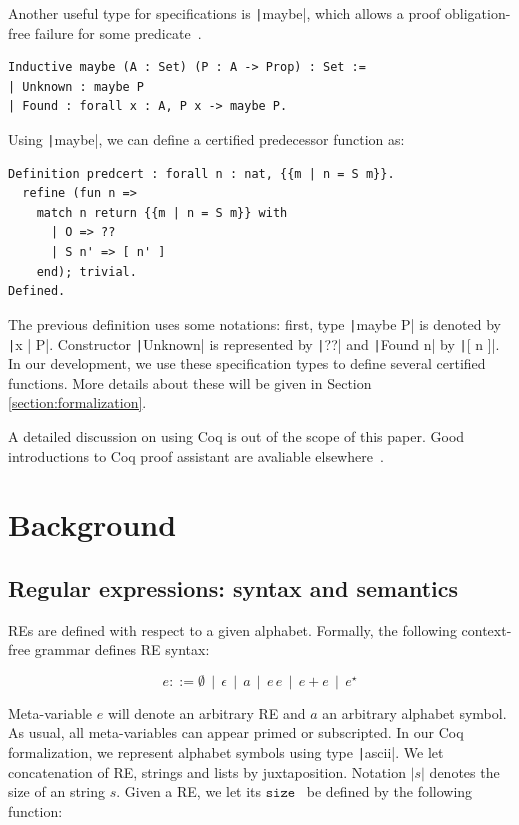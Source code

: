 \documentclass[review]{elsarticle}
\newcommand{\size}{\ensuremath{\texttt{size}}}
\newcommand{\coq}[1]{\texttt|#1|}
\theoremstyle{definition}
\begin{document}
Another useful type for specifications is \coq{maybe}, which allows a proof
obligation-free failure for some predicate~\cite{Chlipala13}.
\begin{verbatim}
Inductive maybe (A : Set) (P : A -> Prop) : Set :=
| Unknown : maybe P
| Found : forall x : A, P x -> maybe P.
\end{verbatim}
Using \coq{maybe}, we can define a certified predecessor function as:
\begin{verbatim}
Definition predcert : forall n : nat, {{m | n = S m}}.
  refine (fun n =>
    match n return {{m | n = S m}} with
      | O => ??
      | S n' => [ n' ]
    end); trivial.
Defined.
\end{verbatim}
The previous definition uses some notations: first, type \coq{maybe P} is
denoted by \coq{{{x | P}}}. Constructor \coq{Unknown} is represented by \coq{??}
and \coq{Found n} by \coq{[ n ]}. In our development, we use these
specification types to define several certified functions. More details about
these will be given in Section \ref{section:formalization}.

A detailed discussion on using Coq is out of the scope of this paper. Good introductions
to Coq proof assistant are avaliable elsewhere~\cite{Bertot2010,Chlipala13}.


\section{Background}\label{section:background}


\subsection{Regular expressions: syntax and semantics}\label{subsection:resyntaxsemantics}


REs are defined with respect to a given alphabet. Formally, the following context-free
grammar defines RE syntax:

\[
e ::= \emptyset\,\mid\,\epsilon\,\mid\,a\,\mid\,e\,e\,\mid\,e+e\,\mid\,e^{\star}
\]

Meta-variable $e$ will denote an arbitrary RE and $a$ an
arbitrary alphabet symbol. As usual, all meta-variables can appear primed or subscripted.
In our Coq formalization, we represent alphabet symbols using type \coq{ascii}. We let concatenation
of RE, strings and lists by juxtaposition. Notation $|s|$
denotes the size of an string $s$. Given a RE, we let its \size~ be defined by the following 
function:
\end{document}
